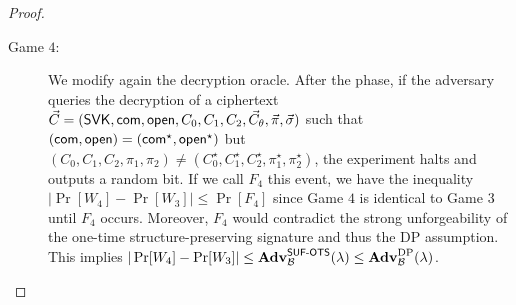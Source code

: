 \begin{proof}
\begin{description}
  \item[\textsf{Game} $4$:] We modify again the decryption oracle. After the phase, if the adversary queries the decryption of a ciphertext 
    $ \vec{C} = (\mathsf{SVK}, \mathsf{com}, \mathsf{open}, C_0, C_1, C_2, \vec{C}_{\theta}, \vec{\pi}, \vec{\sigma})  $ such that $(\mathsf{com},\mathsf{open})=(\mathsf{com}^\star,\mathsf{open}^\star)$
    but $(C_0,C_1,C_2,\pi_1,\pi_2) \neq (C_0^\star,C_1^\star,C_2^\star,\pi_1^\star,\pi_2^\star)$, the experiment halts and outputs a random 
    bit. If we call $F_4$ this event, we have the inequality  $|\Pr[W_4]-\Pr[W_3]| \leq \Pr[F_4]$ since Game $4$ is identical to Game $3$ until $F_4$ occurs.
    Moreover,   $F_4$ would contradict the strong unforgeability of the one-time structure-preserving signature  and thus the DP assumption. This implies  
    $|\Pr[W_4]-\Pr[W_3]| \leq \mathbf{Adv}_{\mathcal{B}}^{\mathsf{SUF}\textsf{-}\mathsf{OTS}}(\lambda)   \leq   \mathbf{Adv}_{\mathcal{B}}^{\mathrm{DP}}(\lambda)$.
    \smallskip \smallskip 


\end{description}
\end{proof}
